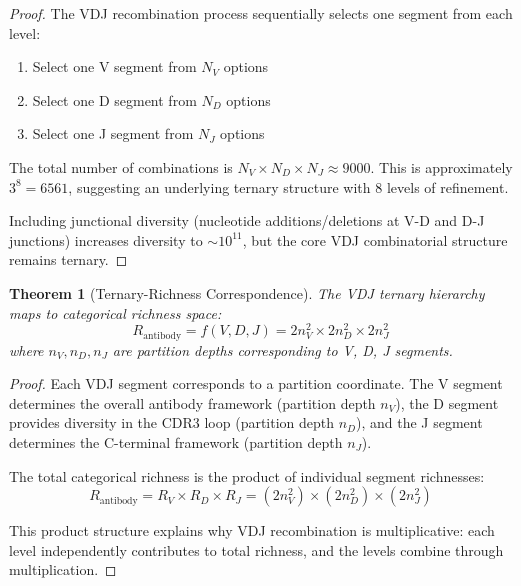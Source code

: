 \documentclass[11pt,twocolumn,a4paper]{article}
\newtheorem{theorem}{Theorem}[section]
\theoremstyle{definition}
\theoremstyle{remark}
\begin{document}
\begin{proof}
The VDJ recombination process sequentially selects one segment from each level:
\begin{enumerate}
\item Select one V segment from $N_V$ options
\item Select one D segment from $N_D$ options  
\item Select one J segment from $N_J$ options
\end{enumerate}

The total number of combinations is $N_V \times N_D \times N_J \approx 9000$. This is approximately $3^8 = 6561$, suggesting an underlying ternary structure with 8 levels of refinement.

Including junctional diversity (nucleotide additions/deletions at V-D and D-J junctions) increases diversity to $\sim 10^{11}$, but the core VDJ combinatorial structure remains ternary.
\end{proof}

\begin{theorem}[Ternary-Richness Correspondence]
\label{thm:ternary_richness_correspondence}
The VDJ ternary hierarchy maps to categorical richness space:
\begin{equation}
R_{\mathrm{antibody}} = f(V, D, J) = 2n_V^2 \times 2n_D^2 \times 2n_J^2
\label{eq:antibody_richness}
\end{equation}
where $n_V, n_D, n_J$ are partition depths corresponding to V, D, J segments.
\end{theorem}

\begin{proof}
Each VDJ segment corresponds to a partition coordinate. The V segment determines the overall antibody framework (partition depth $n_V$), the D segment provides diversity in the CDR3 loop (partition depth $n_D$), and the J segment determines the C-terminal framework (partition depth $n_J$).

The total categorical richness is the product of individual segment richnesses:
\begin{equation}
R_{\mathrm{antibody}} = R_V \times R_D \times R_J = (2n_V^2) \times (2n_D^2) \times (2n_J^2)
\end{equation}

This product structure explains why VDJ recombination is multiplicative: each level independently contributes to total richness, and the levels combine through multiplication.
\end{proof}
\end{document}
